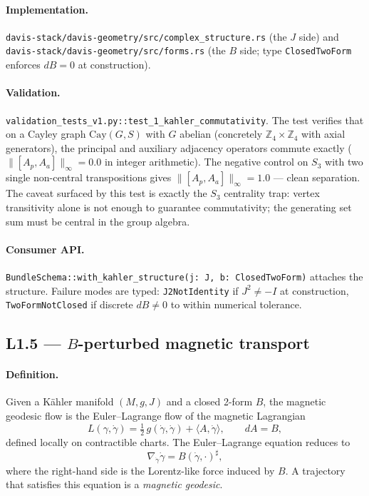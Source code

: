 \documentclass[11pt,letterpaper]{article}
\begin{document}
\paragraph{Implementation.}
\texttt{davis-stack/davis-geometry/src/complex\_structure.rs} (the $J$
side) and \texttt{davis-stack/davis-geometry/src/forms.rs} (the $B$
side; type \texttt{ClosedTwoForm} enforces $dB = 0$ at
construction).

\paragraph{Validation.}
\texttt{validation\_tests\_v1.py::test\_1\_kahler\_commutativity}.
The test verifies that on a Cayley graph $\mathrm{Cay}(G, S)$ with
$G$ abelian (concretely $\mathbb{Z}_4 \times \mathbb{Z}_4$ with axial
generators), the principal and auxiliary adjacency operators
commute exactly ($\|[A_p, A_a]\|_\infty = 0.0$ in integer
arithmetic). The negative control on $S_3$ with two single
non-central transpositions gives $\|[A_p, A_a]\|_\infty = 1.0$ ---
clean separation. The caveat surfaced by this test is exactly the
$S_3$ centrality trap: vertex transitivity alone is not enough to
guarantee commutativity; the generating set sum must be central in
the group algebra.

\paragraph{Consumer API.}
\verb|BundleSchema::with_kahler_structure(j: J, b: ClosedTwoForm)|
attaches the structure. Failure modes are typed:
\verb|J2NotIdentity| if $J^2 \neq -I$ at construction,
\verb|TwoFormNotClosed| if discrete $dB \neq 0$ to within numerical
tolerance.


\subsection{L1.5 --- $B$-perturbed magnetic transport}

\paragraph{Definition.}
Given a K\"ahler manifold $(M, g, J)$ and a closed 2-form $B$, the
magnetic geodesic flow is the Euler--Lagrange flow of the magnetic
Lagrangian
\[
L(\gamma, \dot\gamma) = \tfrac{1}{2} \, g(\dot\gamma, \dot\gamma)
+ \langle A, \dot\gamma \rangle, \qquad dA = B,
\]
defined locally on contractible charts. The Euler--Lagrange
equation reduces to
\[
\nabla_{\dot\gamma} \dot\gamma = B(\dot\gamma, \cdot)^\sharp,
\]
where the right-hand side is the Lorentz-like force induced by $B$.
A trajectory that satisfies this equation is a \emph{magnetic
geodesic}.
\end{document}
